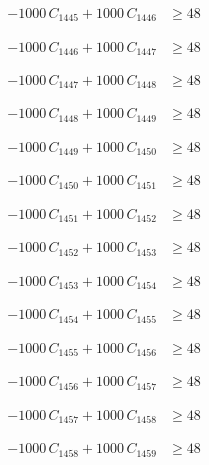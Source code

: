 \documentclass[a4paper,11pt]{article}
\begin{document}
\begin{align}
-1000\,C_{1445} + 1000\,C_{1446} &\geq 48 \nonumber
\end{align}

\begin{align}
-1000\,C_{1446} + 1000\,C_{1447} &\geq 48 \nonumber
\end{align}

\begin{align}
-1000\,C_{1447} + 1000\,C_{1448} &\geq 48 \nonumber
\end{align}

\begin{align}
-1000\,C_{1448} + 1000\,C_{1449} &\geq 48 \nonumber
\end{align}

\begin{align}
-1000\,C_{1449} + 1000\,C_{1450} &\geq 48 \nonumber
\end{align}

\begin{align}
-1000\,C_{1450} + 1000\,C_{1451} &\geq 48 \nonumber
\end{align}

\begin{align}
-1000\,C_{1451} + 1000\,C_{1452} &\geq 48 \nonumber
\end{align}

\begin{align}
-1000\,C_{1452} + 1000\,C_{1453} &\geq 48 \nonumber
\end{align}

\begin{align}
-1000\,C_{1453} + 1000\,C_{1454} &\geq 48 \nonumber
\end{align}

\begin{align}
-1000\,C_{1454} + 1000\,C_{1455} &\geq 48 \nonumber
\end{align}

\begin{align}
-1000\,C_{1455} + 1000\,C_{1456} &\geq 48 \nonumber
\end{align}

\begin{align}
-1000\,C_{1456} + 1000\,C_{1457} &\geq 48 \nonumber
\end{align}

\begin{align}
-1000\,C_{1457} + 1000\,C_{1458} &\geq 48 \nonumber
\end{align}

\begin{align}
-1000\,C_{1458} + 1000\,C_{1459} &\geq 48 \nonumber
\end{align}
\end{document}
